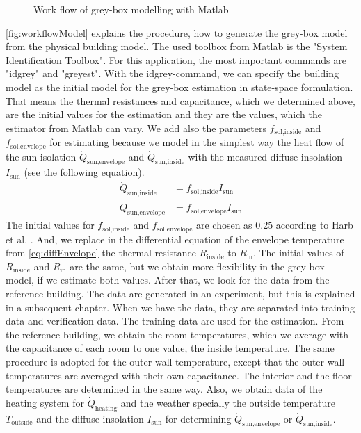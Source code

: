      \begin{figure}
            \centering
            \def\svgwidth{400pt}
            
            \caption{Work flow of grey-box modelling with Matlab}
            \label{fig:workflowModel}
    \end{figure}
    \autoref{fig:workflowModel} explains the procedure, how to generate the grey-box model from the physical building model.\newline 
    The used toolbox from Matlab is the "System Identification Toolbox". For this application, the most important commands are "idgrey" and "greyest".
    With the idgrey-command, we can specify the building model as the initial model for the grey-box estimation in state-space formulation. That means the thermal resistances and capacitance, which we determined above, are the initial values for the estimation and they are the values, which the estimator from Matlab can vary. We add also the parameters $f_\text{sol,inside}$ and $f_\text{sol,envelope}$ for estimating because we model in the simplest way the heat flow of the sun isolation $\dot{Q}_\text{sun,envelope}$ and $\dot{Q}_\text{sun,inside}$ with the measured diffuse insolation $I_\text{sun}$ (see the following equation). 
    \begin{align}
       \label{eq:sun}
        \dot{Q}_\text{sun,inside} &= f_\text{sol,inside} I_\text{sun} \\
        \dot{Q}_\text{sun,envelope} &= f_\text{sol,envelope} I_\text{sun} \nonumber 
    \end{align}
    The initial values for $f_\text{sol,inside}$ and $f_\text{sol,envelope}$ are chosen as $0.25$ according to Harb et al. \cite{Harb.2016}. And, we replace in the differential equation of the envelope temperature from \autoref{eq:diffEnvelope} the thermal resistance $R_\text{inside}$ to $R_\text{in}$. The initial values of $R_\text{inside}$ and $R_\text{in}$ are the same, but we obtain more flexibility in the grey-box model, if we estimate both values.\newline
    After that, we look for the data from the reference building. The data are generated in an experiment, but this is explained in a subsequent chapter. When we have the data, they are separated into training data and verification data. The training data are used for the estimation. From the reference building, we obtain the room temperatures, which we average with the capacitance of each room to one value, the inside temperature. The same procedure is adopted for the outer wall temperature, except that the outer wall temperatures are averaged with their own capacitance. The interior and the floor temperatures are determined in the same way. Also, we obtain data of the heating system for $\dot{Q}_\text{heating}$ and the weather specially the outside temperature $T_\text{outside}$ and the diffuse insolation $I_\text{sun}$ for determining $\dot{Q}_\text{sun,envelope}$ or $\dot{Q}_\text{sun,inside}$. \newline
